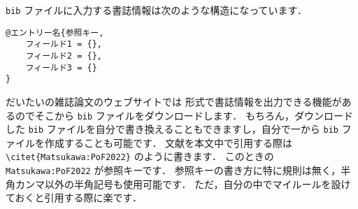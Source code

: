 \verb|bib| ファイルに入力する書誌情報は次のような構造になっています．
\begin{tcolorbox}[enhanced, title=\textgt{\texttt{bib} ファイル内の書誌情報の構造}, drop fuzzy shadow]
\begin{verbatim}
@エントリー名{参照キー,
    フィールド1 = {},
    フィールド2 = {},
    フィールド3 = {}
}
\end{verbatim}
\end{tcolorbox}
\noindent
だいたいの雑誌論文のウェブサイトでは \BibTeX 形式で書誌情報を出力できる機能があるのでそこから \verb|bib| ファイルをダウンロードします．
もちろん，ダウンロードした \verb|bib| ファイルを自分で書き換えることもできますし，自分で一から \verb|bib| ファイルを作成することも可能です．
文献を本文中で引用する際は \verb|\citet{Matsukawa:PoF2022}| のように書きます．
このときの \verb|Matsukawa:PoF2022| が参照キーです．
参照キーの書き方に特に規則は無く，半角カンマ以外の半角記号も使用可能です．
ただ，自分の中でマイルールを設けておくと引用する際に楽です．


